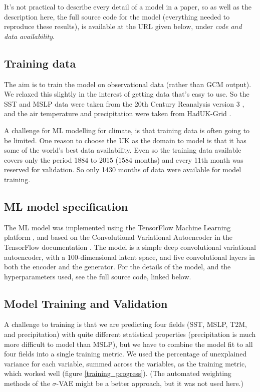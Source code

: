 \documentclass[gmd]{copernicus}
\begin{document}
It's not practical to describe every detail of a model in a paper, so as well as the description here, the full source code for the model (everything needed to reproduce these results), is available at the URL given below, under {\it code and data availability}.

\subsection{Training data}

The aim is to train the model on observational data (rather than GCM output). We relaxed this slightly in the interest of getting data that's easy to use. So the SST and MSLP data were taken from the 20th Century Reanalysis version 3 \citep{slivinski_20crv3.1}, and the air temperature and precipitation
were taken from HadUK-Grid \citep{HadUK-Grid}.

A challenge for ML modelling for climate, is that training data is often going to be limited. One reason to choose the UK as the domain to model is that it has some of the world's best data availability. Even so the training data available covers only the period 1884 to 2015 (1584 months) and every 11th month was reserved for validation. So only 1430 months of data were available for model training.

\subsection{ML model specification}

The ML model was implemented using the TensorFlow Machine Learning platform \citep{tensorflow2015-whitepaper}, and based on the Convolutional Variational Autoencoder in the TensorFlow documentation \citep{TF_CVAE}. The model is a simple deep convolutional variational autoencoder, with a 100-dimensional latent space, and five convolutional layers in both the encoder and the generator. For the details of the model, and the hyperparameters used, see the full source code, linked below.

\subsection{Model Training and Validation}

A challenge to training is that we are predicting four fields (SST, MSLP, T2M, and precipitation) with quite different statistical properties (precipitation is much more difficult to model than MSLP), but we have to combine the model fit to all four fields into a single training metric. We used the percentage of unexplained variance for each variable, summed across the variables, as the training metric, which worked well (figure \ref{training_progress}). (The automated weighting methods of the $\sigma$-VAE \citep{sigma-VAE} might be a better approach, but it was not used here.)
\end{document}
